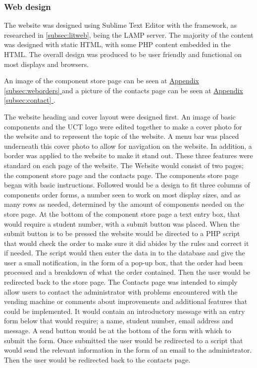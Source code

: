 \documentclass[a4paper,11pt]{article}
\newcommand*{\fullref}[1]{\hyperref[{#1}]{\Appendixautorefname  \ref*{#1} \nameref*{#1}}}
\newcommand*{\Appendixautorefname}{Appendix }
\numberwithin{figure}{section}
\numberwithin{table}{section}
\begin{document}
\subsubsection{Web design}
\label{subsubsec:webdev}

The website was designed using Sublime Text Editor with the framework, as researched in \autoref{subsec:litweb}, being the LAMP server. The majority of the content was designed with static HTML, with some PHP content embedded in the HTML. The overall design was produced to be user friendly and functional on most displays and browsers.

An image of the component store page can be seen at \fullref{subsec:weborders} and a picture of the contacts page can be seen at \fullref{subsec:contact}.

The website heading and cover layout were designed first. An image of basic components and the UCT logo were edited together to make a cover photo for the website and to represent the topic of the website. A menu bar was placed underneath this cover photo to allow for navigation on the website. In addition, a border was applied to the website to make it stand out. These three features were standard on each page of the website. The Website would consist of two pages; the component store page and the contacts page. The components store page began with basic instructions. Followed would be a design to fit three columns of components order forms, a number seen to work on most display sizes, and as many rows as needed, determined by the amount of components needed on the store page. At the bottom of the component store page a text entry box, that would require a student number, with a submit button was placed. When the submit button is to be pressed the website would be directed to a PHP script that would check the order to make sure it did abides by the rules and correct it if needed. The script would then enter the data in to the database and give the user a small notification, in the form of a pop-up box, that the order had been processed and a breakdown of what the order contained. Then the user would be redirected back to the store page. The Contacts page was intended to simply allow users to contact the administrator with problems encountered with the vending machine or comments about improvements and additional features that could be implemented. It would contain an introductory message with an entry form below that would require; a name, student number, email address and message. A send button would be at the bottom of the form with which to submit the form. Once submitted the user would be redirected to a script that would send the relevant information in the form of an email to the administrator. Then the user would be redirected back to the contacts page.
\end{document}
